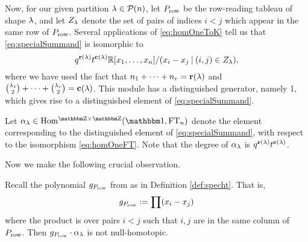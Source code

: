 Now, for our given partition $\lambda\in{\mathcal{P}}(n)$, let $P_{\operatorname{row}}$ be the row-reading tableau of shape $\lambda$, and let $Z_\lambda$ denote the set of pairs of indices $i<j$ which appear in the same row of $P_{\operatorname{row}}$.    Several applications of \eqref{eq:homOneToK} tell us that \eqref{eq:specialSummand} is isomorphic to
\begin{equation}\label{eq:specialSummand2}
 q^{\mathbf{r}(\lambda)}t^{\mathbf{c}(\lambda)} {\mathbb{R}}[x_1,\ldots,x_n]/(x_i-x_j\:|\: (i,j)\in Z_\lambda),
\end{equation}
where we have used the fact that  $n_1+\cdots+n_r=\mathbf{r}(\lambda)$ and $\binom{\lambda_1}{2}+\cdots+\binom{\lambda_r}{2}=\mathbf{c}(\lambda)$.  This module has a distinguished generator, namely 1, which gives rise to a distinguished element of \eqref{eq:specialSummand}.

\begin{definition}\label{def:alphaprime}
Let $\a_\l \in \Homgg(\one,\FT_n)$ denote the element corresponding to the distinguished element of \eqref{eq:specialSummand}, with respect to the isomorphism \eqref{eq:homOneFT}.  Note that the degree of $\alpha_\lambda$ is $q^{\mathbf{r}(\lambda)} t^{\mathbf{c}(\lambda)}$.%
\end{definition}

Now we make the following crucial observation.

\begin{lemma}\label{lemma:eigenmapNotKilled}   Recall the polynomial $g_{P_{\operatorname{row}}}$ from as in Definition \ref{def:specht}.  That is,
\[
g_{P_{\operatorname{row}}} :=\prod (x_i-x_j)
\]
where the product is over pairs $i<j$ such that $i,j$ are in the same column of $P_{\operatorname{row}}$.  Then $g_{P_{\operatorname{row}}} \cdot \alpha_\lambda$ is not null-homotopic. \end{lemma}

